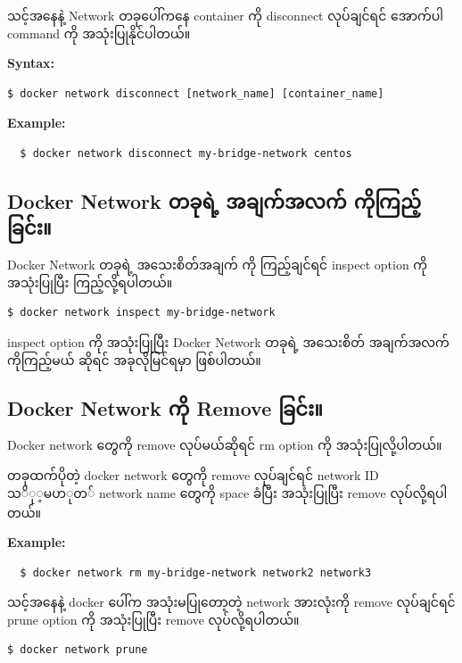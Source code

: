 သင့်အနေနဲ့ Network တခုပေါ်ကနေ container ကို disconnect လုပ်ချင်ရင်
အောက်ပါ command ကို အသုံးပြုနိုင်ပါတယ်။

\textbf{Syntax:}

\begin{verbatim}
$ docker network disconnect [network_name] [container_name]
\end{verbatim}

\textbf{Example:}

\begin{verbatim}
  $ docker network disconnect my-bridge-network centos
\end{verbatim}

\subsection{Docker Network တခုရဲ့ အချက်အလက်
ကိုကြည့်ခြင်း။}\label{docker-network---}

Docker Network တခုရဲ့ အသေးစိတ်အချက် ကို ကြည့်ချင်ရင် inspect option ကို
အသုံးပြုပြီး ကြည့်လို့ရပါတယ်။

\begin{verbatim}
$ docker network inspect my-bridge-network
\end{verbatim}

inspect option ကို အသုံးပြုပြီး Docker Network တခုရဲ့ အသေးစိတ်
အချက်အလက်ကိုကြည့်မယ် ဆိုရင် အခုလိုမြင်ရမှာ ဖြစ်ပါတယ်။

\subsection{Docker Network ကို Remove
ခြင်း။}\label{docker-network--remove-}

Docker network တွေကို remove လုပ်မယ်ဆိုရင် rm option ကို
အသုံးပြုလို့ပါတယ်။

တခုထက်ပိုတဲ့ docker network တွေကို remove လုပ်ချင်ရင် network ID
$သို့မဟုတ်$ network name တွေကို space ခံပြီး အသုံးပြုပြီး remove
လုပ်လို့ရပါတယ်။

\textbf{Example:}

\begin{verbatim}
  $ docker network rm my-bridge-network network2 network3
\end{verbatim}

သင့်အနေနဲ့ docker ပေါ်က အသုံးမပြုတော့တဲ့ network အားလုံးကို remove
လုပ်ချင်ရင် prune option ကို အသုံးပြုပြီး remove လုပ်လို့ရပါတယ်။

\begin{verbatim}
$ docker network prune
\end{verbatim}

